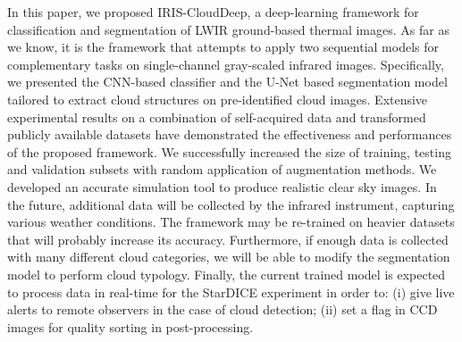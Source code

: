 \documentclass[amt, article]{copernicus}
\begin{document}
In this paper, we proposed IRIS-CloudDeep, a deep-learning framework for classification and segmentation of LWIR
ground-based thermal images. As far as we know, it is the framework that attempts to apply two sequential models for complementary tasks on single-channel gray-scaled infrared images. Specifically, we presented the CNN-based classifier and the U-Net based segmentation model tailored to extract cloud structures on pre-identified cloud images. Extensive experimental results on a combination of self-acquired data and transformed publicly available datasets have demonstrated
the effectiveness and performances of the proposed framework. We successfully increased the size of training, testing and validation subsets with random application of augmentation methods. We developed an accurate simulation tool to produce realistic clear sky images. In the future, additional data will be collected by the infrared instrument, capturing various weather conditions. The framework may be re-trained on heavier datasets that will probably increase its accuracy.  Furthermore, if enough data is collected with many different cloud categories, we will be able to modify the segmentation model to perform cloud typology. Finally, the current trained model is expected to process data in real-time for the StarDICE experiment in order to: (i) give live alerts to remote observers in the case of cloud detection; (ii) set a flag in CCD images for quality sorting in post-processing.










\end{document}
